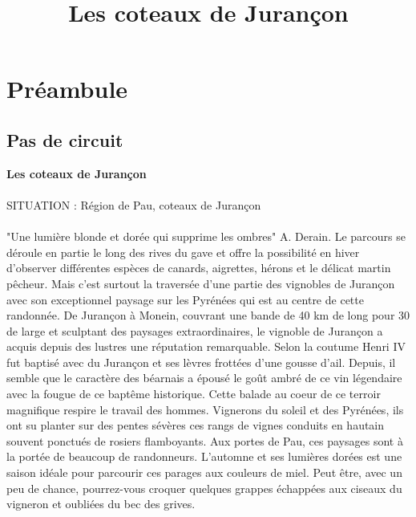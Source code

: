 \documentclass[titlepage]{article}
\begin{document}
        \title{ Les coteaux de Jurançon}
        \date{}
        \maketitle
        \tableofcontents
        
        \section{Préambule}
        
        \subsection{Pas de circuit}
    
        \begin{center}
        \textbf{Les coteaux de Jurançon}
        \end{center}
    
        \paragraph{}
        SITUATION : Région de Pau, coteaux de Jurançon
        \paragraph{}
        "Une lumière blonde et dorée qui supprime les ombres" A. Derain. Le parcours se déroule en partie le long des rives du gave et offre la possibilité en hiver d'observer différentes espèces de canards, aigrettes, hérons et le délicat martin pêcheur. Mais c'est surtout la traversée d'une partie des vignobles de Jurançon avec son exceptionnel paysage sur les Pyrénées qui est au centre de cette randonnée. De Jurançon à Monein, couvrant une bande de 40 km de long pour 30 de large et sculptant des paysages extraordinaires, le vignoble de Jurançon a acquis depuis des lustres une réputation remarquable. Selon la coutume Henri IV fut baptisé avec du Jurançon et ses lèvres frottées d'une gousse d'ail. Depuis, il semble que le caractère des béarnais a épousé le goût ambré de ce vin légendaire avec la fougue de ce baptême historique. Cette balade au coeur de ce terroir magnifique respire le travail des hommes. Vignerons du soleil et des Pyrénées, ils ont su planter sur des pentes sévères ces rangs de vignes conduits en hautain souvent ponctués de rosiers flamboyants. Aux portes de Pau, ces paysages sont à la portée de beaucoup de randonneurs. L'automne et ses lumières dorées est une saison idéale pour parcourir ces parages aux couleurs de miel. Peut être, avec un peu de chance, pourrez-vous croquer quelques grappes échappées aux ciseaux du vigneron et oubliées du bec des grives.
\end{document}
